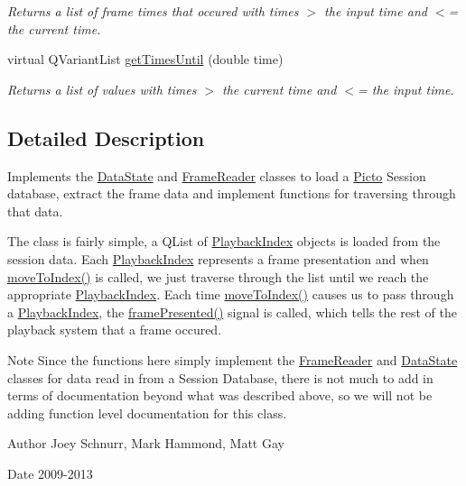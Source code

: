 \begin{DoxyCompactItemize}
\begin{DoxyCompactList}\small\item\em Returns a list of frame times that occured with times $>$ the input time and $<$= the current time. \end{DoxyCompactList}\item 
\hypertarget{class_picto_1_1_frame_state_a9a6d24543965b408b409e5c3a5575588}{virtual Q\-Variant\-List \hyperlink{class_picto_1_1_frame_state_a9a6d24543965b408b409e5c3a5575588}{get\-Times\-Until} (double time)}\label{class_picto_1_1_frame_state_a9a6d24543965b408b409e5c3a5575588}

\begin{DoxyCompactList}\small\item\em Returns a list of values with times $>$ the current time and $<$= the input time. \end{DoxyCompactList}\end{DoxyCompactItemize}


\subsection{Detailed Description}
Implements the \hyperlink{class_picto_1_1_data_state}{Data\-State} and \hyperlink{class_picto_1_1_frame_reader}{Frame\-Reader} classes to load a \hyperlink{namespace_picto}{Picto} Session database, extract the frame data and implement functions for traversing through that data. 

The class is fairly simple, a Q\-List of \hyperlink{struct_picto_1_1_playback_index}{Playback\-Index} objects is loaded from the session data. Each \hyperlink{struct_picto_1_1_playback_index}{Playback\-Index} represents a frame presentation and when \hyperlink{class_picto_1_1_frame_state_af81303f5e09d827fbcf1db0c2485ffef}{move\-To\-Index()} is called, we just traverse through the list until we reach the appropriate \hyperlink{struct_picto_1_1_playback_index}{Playback\-Index}. Each time \hyperlink{class_picto_1_1_frame_state_af81303f5e09d827fbcf1db0c2485ffef}{move\-To\-Index()} causes us to pass through a \hyperlink{struct_picto_1_1_playback_index}{Playback\-Index}, the \hyperlink{class_picto_1_1_frame_state_abaadb881681c0f11bae06935672e04b1}{frame\-Presented()} signal is called, which tells the rest of the playback system that a frame occured.

\begin{DoxyNote}{Note}
Since the functions here simply implement the \hyperlink{class_picto_1_1_frame_reader}{Frame\-Reader} and \hyperlink{class_picto_1_1_data_state}{Data\-State} classes for data read in from a Session Database, there is not much to add in terms of documentation beyond what was described above, so we will not be adding function level documentation for this class.
\end{DoxyNote}
\begin{DoxyAuthor}{Author}
Joey Schnurr, Mark Hammond, Matt Gay 
\end{DoxyAuthor}
\begin{DoxyDate}{Date}
2009-\/2013 
\end{DoxyDate}


